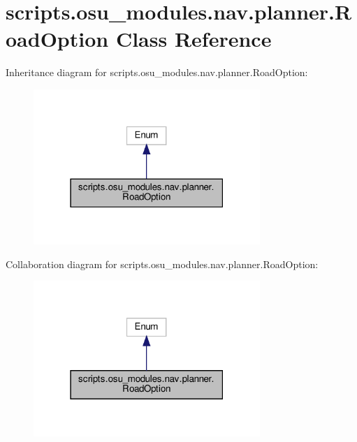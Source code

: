 \hypertarget{classscripts_1_1osu__modules_1_1nav_1_1planner_1_1RoadOption}{}\section{scripts.\+osu\+\_\+modules.\+nav.\+planner.\+Road\+Option Class Reference}
\label{classscripts_1_1osu__modules_1_1nav_1_1planner_1_1RoadOption}


Inheritance diagram for scripts.\+osu\+\_\+modules.\+nav.\+planner.\+Road\+Option\+:
\nopagebreak
\begin{figure}[H]
\begin{center}
\leavevmode
\includegraphics[width=243pt]{dc/df1/classscripts_1_1osu__modules_1_1nav_1_1planner_1_1RoadOption__inherit__graph}
\end{center}
\end{figure}


Collaboration diagram for scripts.\+osu\+\_\+modules.\+nav.\+planner.\+Road\+Option\+:
\nopagebreak
\begin{figure}[H]
\begin{center}
\leavevmode
\includegraphics[width=243pt]{de/d65/classscripts_1_1osu__modules_1_1nav_1_1planner_1_1RoadOption__coll__graph}
\end{center}
\end{figure}
